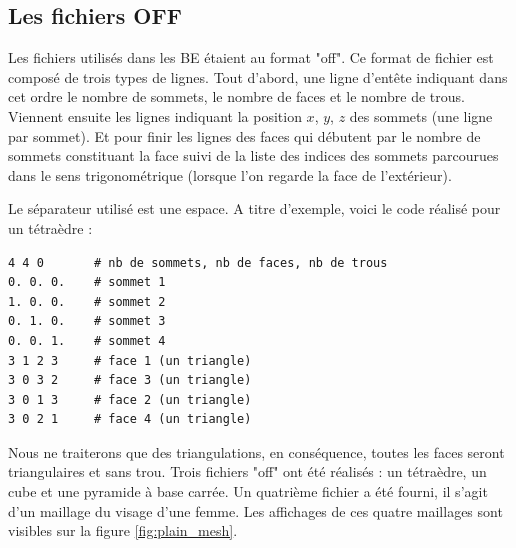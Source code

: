 \documentclass[12pt,a4paper,twoside]{report}
\begin{document}
\subsection{Les fichiers OFF}
Les fichiers utilisés dans les BE étaient au format "off". Ce format de fichier est composé de trois types de lignes.
Tout d'abord, une ligne d'entête indiquant dans cet ordre le nombre de sommets, le nombre de faces et le nombre de trous. Viennent ensuite les lignes indiquant la position $x$, $y$, $z$ des sommets (une ligne par sommet). Et pour finir les lignes des faces qui débutent par le nombre de sommets constituant la face suivi de la liste des indices des sommets parcourues dans le sens trigonométrique (lorsque l'on regarde la face de l'extérieur).

Le séparateur utilisé est une espace. A titre d'exemple, voici le code réalisé pour un tétraèdre :
\begin{lstlisting}
4 4 0		# nb de sommets, nb de faces, nb de trous
0. 0. 0.	# sommet 1
1. 0. 0.	# sommet 2
0. 1. 0.	# sommet 3
0. 0. 1. 	# sommet 4
3 1 2 3		# face 1 (un triangle)
3 0 3 2 	# face 3 (un triangle)
3 0 1 3 	# face 2 (un triangle)
3 0 2 1 	# face 4 (un triangle)
\end{lstlisting}
Nous ne traiterons que des triangulations, en conséquence, toutes les faces seront triangulaires et sans trou.
\smallbreak
Trois fichiers "off" ont été réalisés : un tétraèdre, un cube et une pyramide à base carrée. Un quatrième fichier a été fourni, il s'agit d'un maillage du visage d'une femme. Les affichages de ces quatre maillages sont visibles sur la figure \ref{fig:plain_mesh}.
\end{document}
